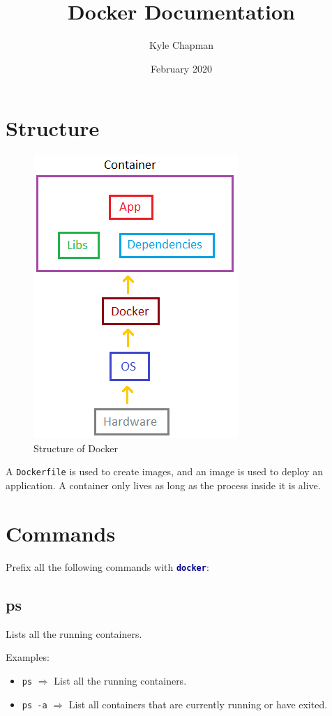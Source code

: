 \documentclass[a4paper, 12pt]{article}
\title{Docker Documentation}
\author{Kyle Chapman}
\date{February 2020}
\newcommand{\bc}[2]{\textbf{\textcolor{#1}{#2}}}
\begin{document}
\maketitle
\tableofcontents
\clearpage

\section{Structure}

\begin{figure}[H]
	\centering
	\includegraphics[scale=0.6]{docker-setup.png}
	\caption{Structure of Docker}
\end{figure}

A \texttt{Dockerfile} is used to create images, and an image is used to deploy
an application. A container only lives as long as the process inside it is alive.

\section{Commands}

Prefix all the following commands with \texttt{\bc{darkblue}{docker}}:

\subsection{ps}

Lists all the running containers.

\vspace{0.5em}
Examples:
\begin{itemize}
	\item \texttt{ps} $\Rightarrow$ List all the running containers.
	\item \texttt{ps -a} $\Rightarrow$ List all containers that are	currently running or
	have exited.
\end{itemize}
\end{document}
